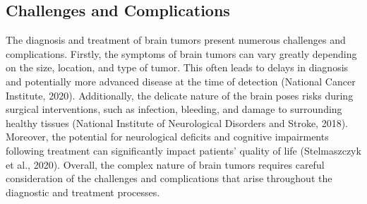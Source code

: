 \documentclass[12pt,oneside]{report}
\begin{document}
\subsection{Challenges and Complications}
The diagnosis and treatment of brain tumors present numerous challenges and complications. Firstly, 
the symptoms of brain tumors can vary greatly depending on the size, location, and type of tumor. 
This often leads to delays in diagnosis and potentially more advanced disease at the time of detection 
(National Cancer Institute, 2020). Additionally, the delicate nature of the brain poses risks during surgical 
interventions, such as infection, bleeding, and damage to surrounding healthy tissues (National Institute of 
Neurological Disorders and Stroke, 2018). Moreover, the potential for neurological deficits and cognitive 
impairments following treatment can significantly impact patients' quality of life (Stelmaszczyk et al., 
2020). Overall, the complex nature of brain tumors requires careful consideration of the challenges and 
complications that arise throughout the diagnostic and treatment processes.
\end{document}
